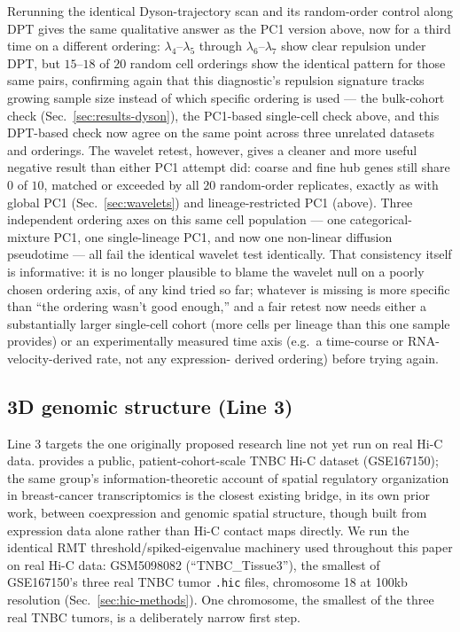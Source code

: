 \documentclass[11pt]{article}
\begin{document}
Rerunning the identical Dyson-trajectory scan and its random-order
control along DPT gives the same qualitative answer as the PC1 version
above, now for a third time on a different ordering:
$\lambda_4$--$\lambda_5$ through $\lambda_6$--$\lambda_7$ show clear
repulsion under DPT, but $15$--$18$ of $20$ random cell orderings show
the identical pattern for those same pairs, confirming again that this
diagnostic's repulsion signature tracks growing sample size instead of
which specific ordering is used --- the bulk-cohort check
(Sec.~\ref{sec:results-dyson}), the PC1-based single-cell check above,
and this DPT-based check now agree on the same point across three
unrelated datasets and orderings. The wavelet retest, however, gives a
cleaner and more useful negative result than either PC1 attempt did:
coarse and fine hub genes still share $0$ of $10$, matched or exceeded
by all $20$ random-order replicates, exactly as with global PC1
(Sec.~\ref{sec:wavelets}) and lineage-restricted PC1 (above). Three
independent ordering axes on this same cell population --- one
categorical-mixture PC1, one single-lineage PC1, and now one
non-linear diffusion pseudotime --- all fail the identical wavelet test
identically. That consistency itself is informative: it is no longer
plausible to blame the wavelet null on a poorly chosen ordering axis,
of any kind tried so far; whatever is missing is more specific than
``the ordering wasn't good enough,'' and a fair retest now needs either
a substantially larger single-cell cohort (more cells per lineage than
this one sample provides) or an experimentally measured time axis
(e.g.\ a time-course or RNA-velocity-derived rate, not any expression-
derived ordering) before trying again.

\subsection{3D genomic structure (Line 3)}
\label{sec:results-hic}

Line 3 targets the one originally proposed research line not yet run
on real Hi-C data. \citet{reyesgopar2025} provides a public,
patient-cohort-scale TNBC Hi-C dataset (GSE167150); the same group's
information-theoretic account of spatial regulatory organization in
breast-cancer transcriptomics \citep{deandajauregui2019spatial} is the
closest existing bridge, in its own prior work, between coexpression
and genomic spatial structure, though built from expression data alone
rather than Hi-C contact maps directly. We run the identical RMT
threshold/spiked-eigenvalue machinery used throughout this paper on
real Hi-C data: GSM5098082 (``TNBC\_Tissue3''), the smallest of
GSE167150's three real TNBC tumor \texttt{.hic} files, chromosome 18 at
100kb resolution (Sec.~\ref{sec:hic-methods}). One chromosome, the
smallest of the three real TNBC tumors, is a deliberately narrow first
step.
\end{document}
